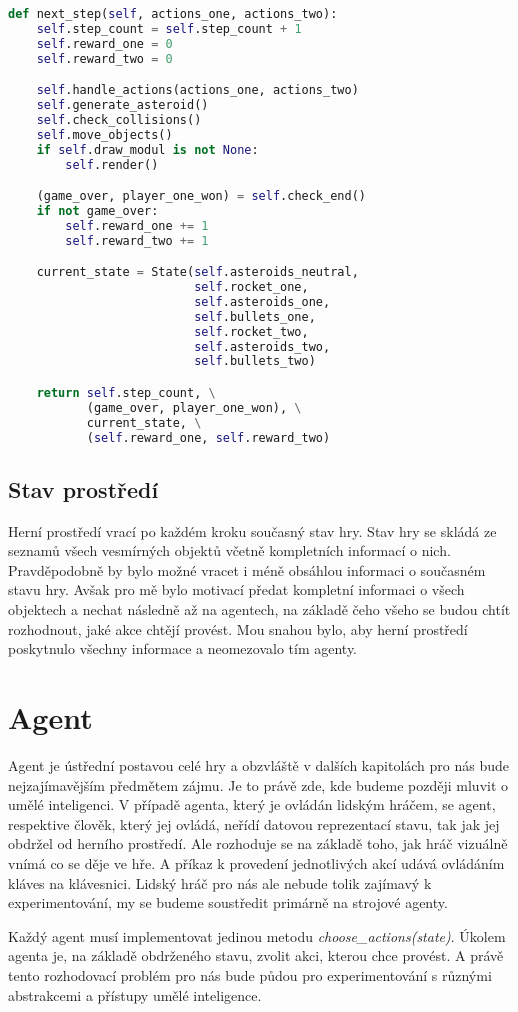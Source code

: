\newpage
\begin{lstlisting}[language=Python]
def next_step(self, actions_one, actions_two):
    self.step_count = self.step_count + 1
    self.reward_one = 0
    self.reward_two = 0

    self.handle_actions(actions_one, actions_two)
    self.generate_asteroid()
    self.check_collisions()
    self.move_objects()
    if self.draw_modul is not None:
        self.render()

    (game_over, player_one_won) = self.check_end()
    if not game_over:
        self.reward_one += 1
        self.reward_two += 1

    current_state = State(self.asteroids_neutral, 
                          self.rocket_one, 
                          self.asteroids_one, 
                          self.bullets_one,
                          self.rocket_two, 
                          self.asteroids_two, 
                          self.bullets_two)

    return self.step_count, \
           (game_over, player_one_won), \
           current_state, \
           (self.reward_one, self.reward_two)
\end{lstlisting}
\newpage



\subsection{Stav prostředí}
Herní prostředí vrací po každém kroku současný stav hry. Stav hry se skládá ze seznamů všech vesmírných objektů včetně kompletních informací o nich.
Pravděpodobně by bylo možné vracet i méně obsáhlou informaci o současném stavu hry. 
Avšak pro mě bylo motivací předat kompletní informaci o všech objektech a nechat následně až na agentech, na základě čeho všeho se budou chtít rozhodnout, jaké akce chtějí provést.
Mou snahou bylo, aby herní prostředí poskytnulo všechny informace a neomezovalo tím agenty.


\section{Agent}
Agent je ústřední postavou celé hry a obzvláště v dalších kapitolách pro nás bude nejzajímavějším předmětem zájmu.
Je to právě zde, kde budeme později mluvit o umělé inteligenci. 
V případě agenta, který je ovládán lidským hráčem, se agent, respektive člověk, který jej ovládá, neřídí datovou reprezentací stavu, tak jak jej obdržel od herního prostředí.
Ale rozhoduje se na základě toho, jak hráč vizuálně vnímá co se děje ve hře. A příkaz k provedení jednotlivých akcí udává ovládáním kláves na klávesnici.
Lidský hráč pro nás ale nebude tolik zajímavý k experimentování, my se budeme soustředit primárně na strojové agenty.
\par
Každý agent musí implementovat jedinou metodu \emph{choose\_actions(state)}. Úkolem agenta je, na základě obdrženého stavu, zvolit akci, kterou chce provést.
A právě tento rozhodovací problém pro nás bude půdou pro experimentování s různými abstrakcemi a přístupy umělé inteligence. 


